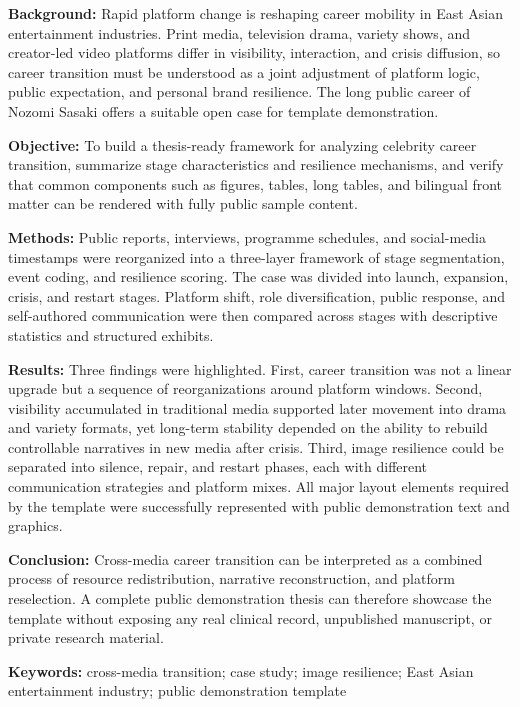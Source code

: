 \noindent\textbf{Background: }Rapid platform change is reshaping career mobility in East Asian entertainment industries. Print media, television drama, variety shows, and creator-led video platforms differ in visibility, interaction, and crisis diffusion, so career transition must be understood as a joint adjustment of platform logic, public expectation, and personal brand resilience. The long public career of Nozomi Sasaki offers a suitable open case for template demonstration.

\noindent\textbf{Objective: }To build a thesis-ready framework for analyzing celebrity career transition, summarize stage characteristics and resilience mechanisms, and verify that common components such as figures, tables, long tables, and bilingual front matter can be rendered with fully public sample content.

\noindent\textbf{Methods: }Public reports, interviews, programme schedules, and social-media timestamps were reorganized into a three-layer framework of stage segmentation, event coding, and resilience scoring. The case was divided into launch, expansion, crisis, and restart stages. Platform shift, role diversification, public response, and self-authored communication were then compared across stages with descriptive statistics and structured exhibits.

\noindent\textbf{Results: }Three findings were highlighted. First, career transition was not a linear upgrade but a sequence of reorganizations around platform windows. Second, visibility accumulated in traditional media supported later movement into drama and variety formats, yet long-term stability depended on the ability to rebuild controllable narratives in new media after crisis. Third, image resilience could be separated into silence, repair, and restart phases, each with different communication strategies and platform mixes. All major layout elements required by the template were successfully represented with public demonstration text and graphics.

\noindent\textbf{Conclusion: }Cross-media career transition can be interpreted as a combined process of resource redistribution, narrative reconstruction, and platform reselection. A complete public demonstration thesis can therefore showcase the template without exposing any real clinical record, unpublished manuscript, or private research material.

\noindent\textbf{Keywords: }cross-media transition; case study; image resilience; East Asian entertainment industry; public demonstration template
